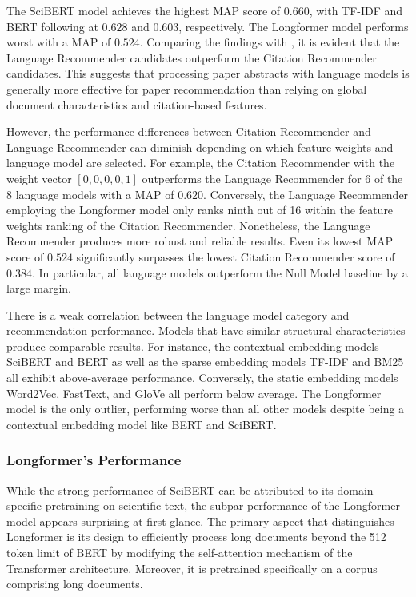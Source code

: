 The SciBERT model achieves the highest \ac{MAP} score of $0.660$, with TF-IDF and BERT following at $0.628$ and $0.603$, respectively. The Longformer model performs worst with a \ac{MAP} of $0.524$. Comparing the findings with , it is evident that the Language Recommender candidates outperform the Citation Recommender candidates. This suggests that processing paper abstracts with language models is generally more effective for paper recommendation than relying on global document characteristics and citation-based features.

However, the performance differences between Citation Recommender and Language Recommender can diminish depending on which feature weights and language model are selected.
For example, the Citation Recommender with the weight vector $[0, 0, 0, 0, 1]$ outperforms the Language Recommender for 6 of the 8 language models with a \ac{MAP} of $0.620$. Conversely, the Language Recommender employing the Longformer model only ranks ninth out of 16 within the feature weights ranking of the Citation Recommender.
Nonetheless, the Language Recommender produces more robust and reliable results. Even its lowest \ac{MAP} score of $0.524$ significantly surpasses the lowest Citation Recommender score of $0.384$.
In particular, all language models outperform the Null Model baseline by a large margin.

There is a weak correlation between the language model category and recommendation performance. Models that have similar structural characteristics produce comparable results. For instance, the contextual embedding models SciBERT and BERT as well as the sparse embedding models TF-IDF and BM25 all exhibit above-average performance.
Conversely, the static embedding models Word2Vec, FastText, and GloVe all perform below average. The Longformer model is the only outlier, performing worse than all other models despite being a contextual embedding model like BERT and SciBERT.


\subsubsection*{Longformer's Performance}

While the strong performance of SciBERT can be attributed to its domain-specific pretraining on scientific text, the subpar performance of the Longformer model appears surprising at first glance.
The primary aspect that distinguishes Longformer is its design to efficiently process long documents beyond the 512 token limit of BERT by modifying the self-attention mechanism of the Transformer architecture.
Moreover, it is pretrained specifically on a corpus comprising long documents.

